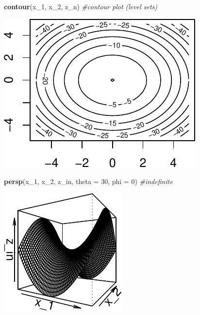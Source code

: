 \documentclass[11pt,]{article}
\newenvironment{Shaded}{\begin{snugshade}}{\end{snugshade}}
\newcommand{\KeywordTok}[1]{\textcolor[rgb]{0.13,0.29,0.53}{\textbf{#1}}}
\newcommand{\DataTypeTok}[1]{\textcolor[rgb]{0.13,0.29,0.53}{#1}}
\newcommand{\DecValTok}[1]{\textcolor[rgb]{0.00,0.00,0.81}{#1}}
\newcommand{\CommentTok}[1]{\textcolor[rgb]{0.56,0.35,0.01}{\textit{#1}}}
\newcommand{\NormalTok}[1]{#1}
\begin{document}
\begin{Shaded}
\begin{Highlighting}[]
\KeywordTok{contour}\NormalTok{(x_}\DecValTok{1}\NormalTok{, x_}\DecValTok{2}\NormalTok{, z_n) }\CommentTok{#contour plot (level sets)}
\end{Highlighting}
\end{Shaded}

\begin{center}\includegraphics{Optimization_files/figure-latex/FOC_dim_2-4} \end{center}

\begin{Shaded}
\begin{Highlighting}[]
\KeywordTok{persp}\NormalTok{(x_}\DecValTok{1}\NormalTok{, x_}\DecValTok{2}\NormalTok{, z_in, }\DataTypeTok{theta =} \DecValTok{30}\NormalTok{, }\DataTypeTok{phi =} \DecValTok{0}\NormalTok{) }\CommentTok{#indefinite}
\end{Highlighting}
\end{Shaded}

\begin{center}\includegraphics{Optimization_files/figure-latex/FOC_dim_2-5} \end{center}
\end{document}
